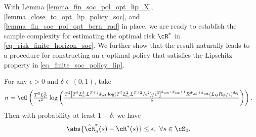 \documentclass[9pt]{article}
\numberwithin{equation}{section}
\begin{document}

With Lemma \ref{lemma_fin_soc_pol_opt_lip_X}, \ref{lemma_close_to_opt_lip_policy_soc}, and \ref{lemma_fin_soc_pol_opt_bern_rad} in place, we are ready to establish the sample complexity for estimating the optimal risk $\cR^*$ in \eqref{eq_risk_finite_horizon_soc}. We further show that the result naturally leads to a procedure for constructing an $\epsilon$-optimal policy that satisfies the Lipschitz property in \eqref{eq_finite_soc_policy_lip}.

\begin{theorem}\label{thrm_sample_opt_soc_finite}
    For any $\epsilon > 0$ and $\delta \in (0,1)$, take
    \begin{align}
        n = \cO \left(\tfrac{T^3 L_C^2}{\epsilon^2} \log \left(\tfrac{T^2\left[T^6 L_C^3 L^{T+1} d_\cA \log(T^5 L_C^2 L^{T+2}/\epsilon^2)/\epsilon^3\right]^{d_\cS + d_\cA + 1} R^{d_\cS + d_\cA} (L_\Theta R_\Theta/\epsilon)^{d_\Theta}}{\delta}\right)\right). \nonumber
    \end{align}
    Then with probability at least $1-\delta$, we have
    \begin{align*}
        \abs{\hat \cR_n^*(s) - \cR^*(s)} \leq \epsilon, ~ \forall s \in \cS_0. 
    \end{align*}
\end{theorem}
%
\end{document}
